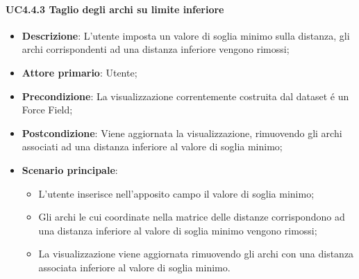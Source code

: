 \paragraph{UC4.4.3 Taglio degli archi su limite inferiore}
\label{par:uc4.4.3}
\begin{itemize}
    \item \textbf{Descrizione}:     L'utente imposta un valore di soglia minimo sulla distanza, gli archi corrispondenti ad una distanza inferiore vengono rimossi;
    \item \textbf{Attore primario}: Utente;
    \item \textbf{Precondizione}:   La visualizzazione correntemente costruita dal dataset é un Force Field;
    \item \textbf{Postcondizione}:  Viene aggiornata la visualizzazione, rimuovendo gli archi associati ad una distanza inferiore al valore di soglia minimo;
    \item \textbf{Scenario principale}:
    \begin{itemize}
        \item L'utente inserisce nell'apposito campo il valore di soglia minimo;
        \item Gli archi le cui coordinate nella matrice delle distanze corrispondono ad una distanza inferiore al valore di soglia minimo vengono rimossi;
        \item La visualizzazione viene aggiornata rimuovendo gli archi con una distanza associata inferiore al valore di soglia minimo.
    \end{itemize}
\end{itemize}


